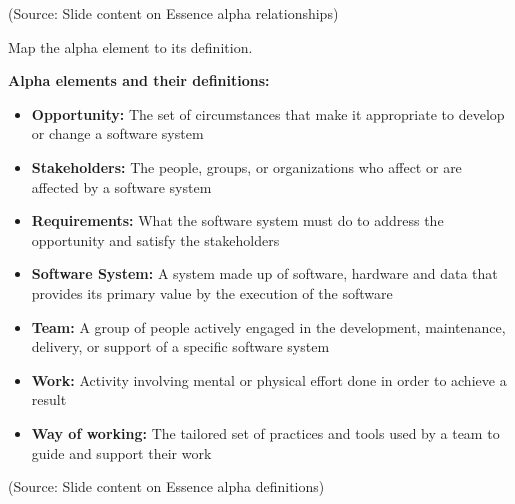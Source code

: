\documentclass[12pt]{article}
\begin{document}
(Source: Slide content on Essence alpha relationships)

\begin{questionbox}
Map the alpha element to its definition.
\end{questionbox}

\textbf{Alpha elements and their definitions:}

\begin{itemize}
    \item \textbf{Opportunity:} The set of circumstances that make it appropriate to develop or change a software system
    \item \textbf{Stakeholders:} The people, groups, or organizations who affect or are affected by a software system
    \item \textbf{Requirements:} What the software system must do to address the opportunity and satisfy the stakeholders
    \item \textbf{Software System:} A system made up of software, hardware and data that provides its primary value by the execution of the software
    \item \textbf{Team:} A group of people actively engaged in the development, maintenance, delivery, or support of a specific software system
    \item \textbf{Work:} Activity involving mental or physical effort done in order to achieve a result
    \item \textbf{Way of working:} The tailored set of practices and tools used by a team to guide and support their work
\end{itemize}

(Source: Slide content on Essence alpha definitions)
\end{document}
